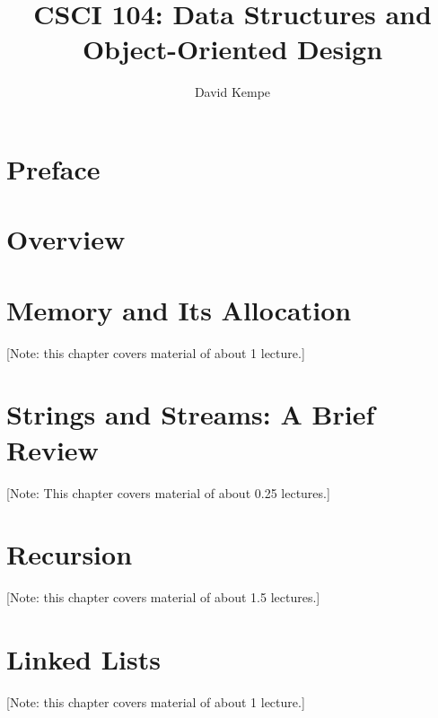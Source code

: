 \documentclass{book}
\title{CSCI 104: Data Structures and Object-Oriented Design}
\author{David Kempe}
\begin{document}
\begin{titlepage}
\maketitle
\end{titlepage}


\chapter*{Preface}
\label{chapter:preface}



\tableofcontents


\chapter{Overview}
\label{chapter:overview}

%


\chapter{Memory and Its Allocation}
\label{chap:dynamic-memory}
[Note: this chapter covers material of about 1 lecture.]

%
%

\chapter{Strings and Streams: A Brief Review}
\label{chap:strings-streams}
[Note: This chapter covers material of about 0.25 lectures.]

%
% 

\chapter{Recursion}
\label{chap:recursion}
[Note: this chapter covers material of about 1.5 lectures.]

%
% 

\chapter{Linked Lists}
\label{chap:linked-lists}
[Note: this chapter covers material of about 1 lecture.]
\end{document}
